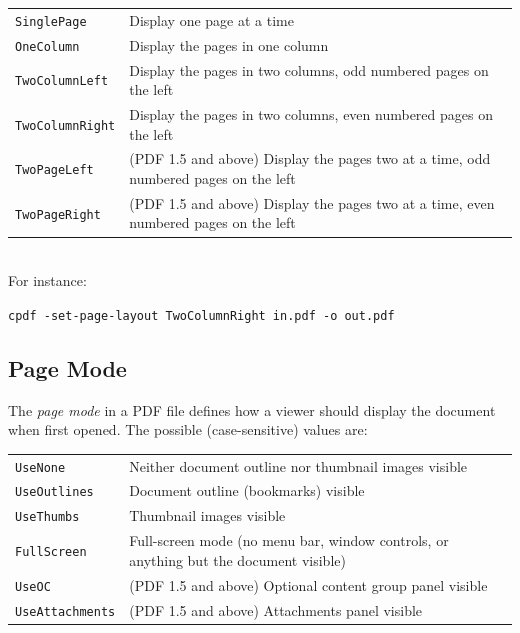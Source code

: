 \documentclass[a4paper,makeidx]{memoir}
\begin{document}
\vspace{2mm}
  \begin{tabular}{ll}
    \texttt{SinglePage} & \vspace{2mm} \parbox{8cm}{Display one page at a time} \\
    \texttt{OneColumn} & \vspace{2mm} \parbox{8cm}{Display the pages in one column} \\
    \texttt{TwoColumnLeft} & \vspace{2mm} \parbox{8cm}{Display the pages in two columns, odd numbered pages on the left} \\
    \texttt{TwoColumnRight} & \vspace{2mm} \parbox{8cm}{Display the pages in two columns, even numbered pages on the left} \\
    \texttt{TwoPageLeft} & \vspace{2mm} \parbox{8cm}{(PDF 1.5 and above) Display the pages two at a time, odd numbered pages on the left} \\
    \texttt{TwoPageRight} & \vspace{2mm} \parbox{8cm}{(PDF 1.5 and above) Display the pages two at a time, even numbered pages on the left}
  \end{tabular}\\

  \noindent For instance:
  \begin{framed}
    \small\verb!cpdf -set-page-layout TwoColumnRight in.pdf -o out.pdf!
  \end{framed}
  
  \subsection{Page Mode}
  The \textit{page mode} in a PDF file defines how a viewer should display the
document when first opened. The possible (case-sensitive) values are:

\vspace{2mm}
  \begin{tabular}{ll}
    \texttt{UseNone} & \vspace{2mm} \parbox{8cm}{Neither document outline nor thumbnail images visible} \\
    \texttt{UseOutlines} & \vspace{2mm} \parbox{8cm}{Document outline (bookmarks) visible} \\
    \texttt{UseThumbs} & \vspace{2mm} \parbox{8cm}{Thumbnail images visible} \\
    \texttt{FullScreen} & \vspace{2mm} \parbox{8cm}{Full-screen mode (no menu bar, window controls, or anything but the document visible)} \\
    \texttt{UseOC} & \vspace{2mm} \parbox{8cm}{(PDF 1.5 and above) Optional content group panel visible} \\
    \texttt{UseAttachments} & \vspace{2mm} \parbox{8cm}{(PDF 1.5 and above) Attachments panel visible}
  \end{tabular}\\
\end{document}
